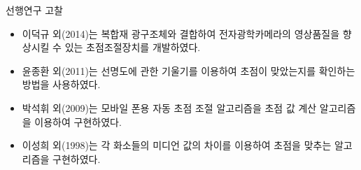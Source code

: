 \documentclass{gshs_poster_beamer}
\begin{document}
\begin{columns}[T]
\begin{posterbox}{선행연구 고찰}
	\begin{itemize}
		\item 이덕규 외(2014)는 복합재 광구조체와 결합하여 전자광학카메라의 영상품질을 향상시킬 수 있는 초점조절장치를 개발하였다.\cite{leedukgu2014}
		\item 윤종환 외(2011)는 선명도에 관한 기울기를 이용하여 초점이 맞았는지를 확인하는 방법을 사용하였다.\cite{yunjonghwan2011lcd}
		\item 박석휘 외(2009)는 모바일 폰용 자동 초점 조절 알고리즘을 초점 값 계산 알고리즘을 이용하여 구현하였다.\cite{parksukhui2009Median}
		\item 이성희 외(1998)는 각 화소들의 미디언 값의 차이를 이용하여 초점을 맞추는 알고리즘을 구현하였다.\cite{leeseonghee1998Median}
	\end{itemize}
\end{posterbox}

\vspace{1em}


\end{columns}
\end{document}

